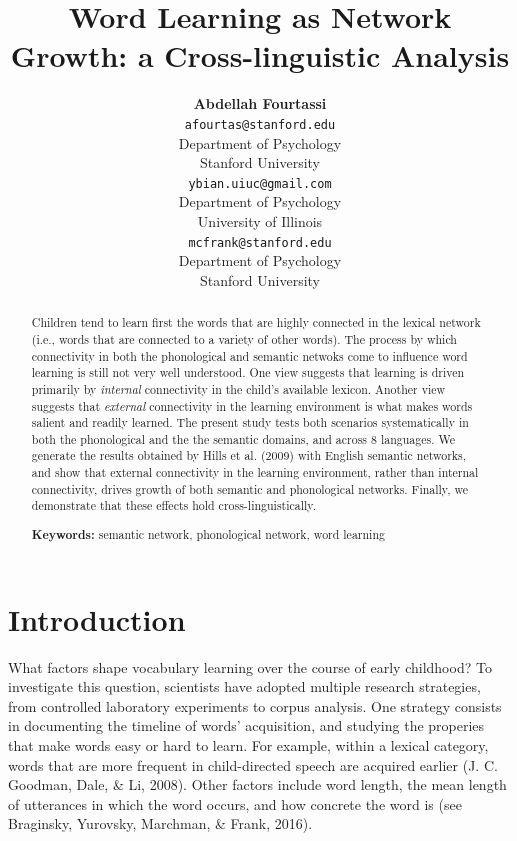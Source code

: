 \documentclass[10pt, letterpaper]{article}
\title{Word Learning as Network Growth: a Cross-linguistic Analysis}
\author{{\large \bf Abdellah Fourtassi} \\ \texttt{afourtas@stanford.edu} \\ Department of Psychology \\ Stanford University \And {\large \bf Yuan Bian} \\ \texttt{ybian.uiuc@gmail.com} \\ Department of Psychology \\ University of Illinois \And {\large \bf Michael C. Frank} \\ \texttt{mcfrank@stanford.edu} \\ Department of Psychology \\ Stanford University}
\begin{document}
\maketitle

\begin{abstract}
Children tend to learn first the words that are highly connected in the
lexical network (i.e., words that are connected to a variety of other
words). The process by which connectivity in both the phonological and
semantic netwoks come to influence word learning is still not very well
understood. One view suggests that learning is driven primarily by
\emph{internal} connectivity in the child's available lexicon. Another
view suggests that \emph{external} connectivity in the learning
environment is what makes words salient and readily learned. The present
study tests both scenarios systematically in both the phonological and
the the semantic domains, and across 8 languages. We generate the
results obtained by Hills et al. (2009) with English semantic networks,
and show that external connectivity in the learning environment, rather
than internal connectivity, drives growth of both semantic and
phonological networks. Finally, we demonstrate that these effects hold
cross-linguistically.

\textbf{Keywords:}
semantic network, phonological network, word learning
\end{abstract}

\section{Introduction}\label{introduction}

What factors shape vocabulary learning over the course of early
childhood? To investigate this question, scientists have adopted
multiple research strategies, from controlled laboratory experiments to
corpus analysis. One strategy consists in documenting the timeline of
words' acquisition, and studying the properies that make words easy or
hard to learn. For example, within a lexical category, words that are
more frequent in child-directed speech are acquired earlier (J. C.
Goodman, Dale, \& Li, 2008). Other factors include word length, the mean
length of utterances in which the word occurs, and how concrete the word
is (see Braginsky, Yurovsky, Marchman, \& Frank, 2016).
\end{document}
